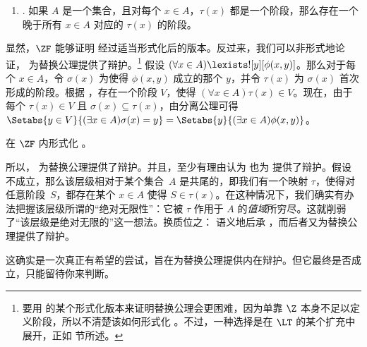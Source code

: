 \documentclass[../../../include/open-logic-section]{subfiles}
\begin{document}
\begin{enumerate}
	\item[] \stagescofin. 如果 $A$ 是一个集合，且对每个 $x \in A$，$\tau(x)$ 都是一个阶段，那么存在一个晚于所有 $x \in A$ 对应的 $\tau(x)$ 的阶段。
\end{enumerate}

显然，$\ZF$ 能够证明 \stagescofin{} 经过适当形式化后的版本。反过来，我们可以非形式地论证，\stagescofin{} 为替换公理提供了辩护。\footnote{要用 \stagescofin{} 的某个形式化版本来证明替换公理会更困难，因为单靠 $\Z$ 本身不足以定义阶段，所以不清楚该如何形式化 \stagescofin。不过，一种选择是在 $\LT$ 的某个扩充中展开，正如  节所述。} 假设 $(\forall x \in A)\lexists![y][\phi(x,y)]$。那么对于每个 $x \in A$，令 $\sigma(x)$ 为使得 $\phi(x,y)$ 成立的那个 $y$，并令 $\tau(x)$ 为 $\sigma(x)$ 首次形成的阶段。根据 \stagescofin，存在一个阶段 $V$，使得 $(\forall x \in A)\tau(x)\in V$。现在，由于每个 $\tau(x) \in V$ 且 $\sigma(x) \subseteq \tau(x)$，由分离公理可得 $\Setabs{y \in V}{(\exists x \in A)\sigma(x) = y} = \Setabs{y}{(\exists x \in A)\phi(x,y)}$。

\begin{prob}
	在 $\ZF$ 内形式化 \stagescofin{}。
\end{prob}

所以，\stagescofin{} 为替换公理提供了辩护。并且，至少有理由认为 \stagesinex{} 也为 \stagescofin{} 提供了辩护。假设 \stagescofin{} 不成立，那么该层级相对于某个集合~$A$ 是共尾的，即我们有一个映射 $\tau$，使得对任意阶段~$S$，都存在某个 $x \in A$ 使得 $S \in \tau(x)$。在这种情况下，我们确实有办法把握该层级所谓的“绝对无限性”：它被 $\tau$ 作用于 $A$ 的\emph{值域}所穷尽。这就削弱了“该层级是绝对无限的”这一想法。换质位之：\stagesinex{} 语义地后承 \stagescofin，而后者又为替换公理提供了辩护。

这确实是一次真正有希望的尝试，旨在为替换公理提供内在辩护。但它最终是否成立，只能留待你来判断。
\end{document}
